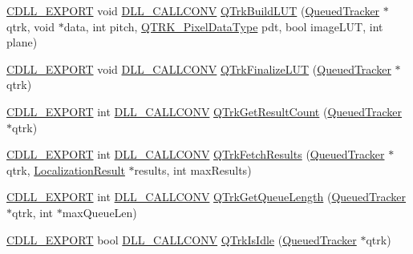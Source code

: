 \begin{DoxyCompactItemize}
\item 
\hyperlink{dllmacros_8h_af97e4004759ff877db017c3d1a855482}{C\+D\+L\+L\+\_\+\+E\+X\+P\+O\+RT} void \hyperlink{dllmacros_8h_a6596c37c55424b395798708344d63791}{D\+L\+L\+\_\+\+C\+A\+L\+L\+C\+O\+NV} \hyperlink{group__c__api_ga4c0fafa8ed3afa1f77145049c2fe399b}{Q\+Trk\+Build\+L\+UT} (\hyperlink{class_queued_tracker}{Queued\+Tracker} $\ast$qtrk, void $\ast$data, int pitch, \hyperlink{qtrk__c__api_8h_aad82367b3ea592a142bb50a2fb538b0b}{Q\+T\+R\+K\+\_\+\+Pixel\+Data\+Type} pdt, bool image\+L\+UT, int plane)
\item 
\hyperlink{dllmacros_8h_af97e4004759ff877db017c3d1a855482}{C\+D\+L\+L\+\_\+\+E\+X\+P\+O\+RT} void \hyperlink{dllmacros_8h_a6596c37c55424b395798708344d63791}{D\+L\+L\+\_\+\+C\+A\+L\+L\+C\+O\+NV} \hyperlink{group__c__api_ga001b7cce7559916db5198075f4b7ff21}{Q\+Trk\+Finalize\+L\+UT} (\hyperlink{class_queued_tracker}{Queued\+Tracker} $\ast$qtrk)
\item 
\hyperlink{dllmacros_8h_af97e4004759ff877db017c3d1a855482}{C\+D\+L\+L\+\_\+\+E\+X\+P\+O\+RT} int \hyperlink{dllmacros_8h_a6596c37c55424b395798708344d63791}{D\+L\+L\+\_\+\+C\+A\+L\+L\+C\+O\+NV} \hyperlink{group__c__api_gacec9880407759cffad8c29ad2eeb1e19}{Q\+Trk\+Get\+Result\+Count} (\hyperlink{class_queued_tracker}{Queued\+Tracker} $\ast$qtrk)
\item 
\hyperlink{dllmacros_8h_af97e4004759ff877db017c3d1a855482}{C\+D\+L\+L\+\_\+\+E\+X\+P\+O\+RT} int \hyperlink{dllmacros_8h_a6596c37c55424b395798708344d63791}{D\+L\+L\+\_\+\+C\+A\+L\+L\+C\+O\+NV} \hyperlink{group__c__api_ga8fac708f09e509fca0004a7dad8c2872}{Q\+Trk\+Fetch\+Results} (\hyperlink{class_queued_tracker}{Queued\+Tracker} $\ast$qtrk, \hyperlink{struct_localization_result}{Localization\+Result} $\ast$results, int max\+Results)
\item 
\hyperlink{dllmacros_8h_af97e4004759ff877db017c3d1a855482}{C\+D\+L\+L\+\_\+\+E\+X\+P\+O\+RT} int \hyperlink{dllmacros_8h_a6596c37c55424b395798708344d63791}{D\+L\+L\+\_\+\+C\+A\+L\+L\+C\+O\+NV} \hyperlink{group__c__api_ga3f127b31b11968ff65ce6593ecab2378}{Q\+Trk\+Get\+Queue\+Length} (\hyperlink{class_queued_tracker}{Queued\+Tracker} $\ast$qtrk, int $\ast$max\+Queue\+Len)
\item 
\hyperlink{dllmacros_8h_af97e4004759ff877db017c3d1a855482}{C\+D\+L\+L\+\_\+\+E\+X\+P\+O\+RT} bool \hyperlink{dllmacros_8h_a6596c37c55424b395798708344d63791}{D\+L\+L\+\_\+\+C\+A\+L\+L\+C\+O\+NV} \hyperlink{group__c__api_ga050d8107baef0439f34e34d951da83fd}{Q\+Trk\+Is\+Idle} (\hyperlink{class_queued_tracker}{Queued\+Tracker} $\ast$qtrk)

\end{DoxyCompactItemize}
